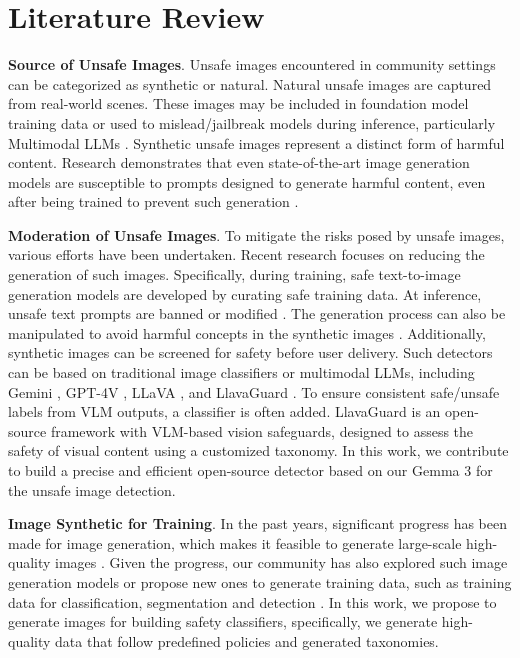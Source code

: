 \section{Literature Review}


\textbf{Source of Unsafe Images}.
Unsafe images encountered in community settings can be categorized as synthetic or natural. Natural unsafe images are captured from real-world scenes. These images may be included in foundation model training data or used to mislead/jailbreak models during inference, particularly Multimodal LLMs \citep{gong2023figstep,liu2024mm,chen2024red}. Synthetic unsafe images represent a distinct form of harmful content. Research demonstrates that even state-of-the-art image generation models are susceptible to prompts designed to generate harmful content, even after being trained to prevent such generation \citep{schramowski2023safe,li2024self,liu2024latent,liu2024multimodal,cheng2024uncovering}.

\textbf{Moderation of Unsafe Images}.
To mitigate the risks posed by unsafe images, various efforts have been undertaken. Recent research focuses on reducing the generation of such images. Specifically, during training, safe text-to-image generation models are developed by curating safe training data. At inference, unsafe text prompts are banned or modified \citep{liu2024latent}. The generation process can also be manipulated to avoid harmful concepts in the synthetic images \citep{schramowski2023safe,li2024self}. Additionally, synthetic images can be screened for safety before user delivery. Such detectors can be based on traditional image classifiers or multimodal LLMs, including Gemini \citep{team2024gemini}, GPT-4V \citep{gpt4v}, LLaVA \citep{llava}, and LlavaGuard \citep{helff2024llavaguard}. To ensure consistent safe/unsafe labels from VLM outputs, a classifier is often added. LlavaGuard \cite{helff2024llavaguard} is an open-source framework with VLM-based vision safeguards, designed to assess the safety of visual content using a customized taxonomy. In this work, we contribute to build a precise and efficient open-source detector based on our Gemma 3 \citep{gemma_2025} for the unsafe image detection.

\textbf{Image Synthetic for Training}.
In the past years, significant progress has been made for image generation, which makes it feasible to generate large-scale high-quality images \citep{baldridge2024imagen,rombach2022high}. Given the progress, our community has also explored such image generation models or propose new ones to generate training data, such as training data for classification, segmentation and detection \citep{wu2023datasetdm, suri2023gen2det,wu2023diffumask, zeng2024shieldgemma}. In this work, we propose to generate images for building safety classifiers, specifically, we generate high-quality data that follow predefined policies and 
generated taxonomies.  
